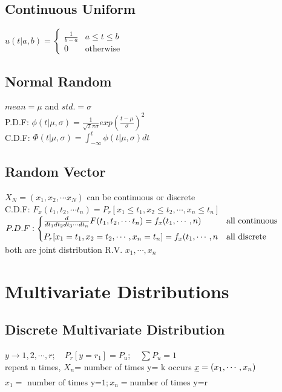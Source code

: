 \documentclass{article}
\begin{document}
\subsection{Continuous Uniform} 		
	$ u(t| a, b)= \begin{cases} \frac{1}{b-a}  & a \le t \le b \\ 
	0& \text{otherwise} \end{cases}$
	
            
\subsection{Normal Random}             
	$mean= \mu $ and $std.= \sigma $
	\\P.D.F: $\phi(t| \mu, \sigma)= \frac{1}{\sqrt{2} \pi \sigma }exp(\frac{t-\mu}{\sigma})^2$
	\\C.D.F: $\Phi(t| \mu, \sigma)=  \int_{-\infty}^{t} \phi(t| \mu, \sigma)dt$
        
\subsection{Random Vector}        
	$X_N=(x_1, x_2, \cdots x_N)$ can be continuous or discrete
	\\C.D.F: $F_x(t_1, t_2, \cdots t_n)= P_r[x_1\le t_1,x_2\le t_2, \cdots, x_n\le t_n]$
	\\$P.D.F: \begin{cases}
	\frac{d}{dt_1 dt_2 dt_3 \cdots dt_n} F(t_1, t_2, \cdots t_n)= f_{\uwave{x}}(t_1, \cdots, n) & \text{all continuous}\\
	P_r[x_1= t_1,x_2= t_2, \cdots, x_n=  t_n]=f_{x}(t_1, \cdots, n &\text{all discrete}  \end{cases}$
	\\both are joint distribution R.V. $x_1, \cdots, x_n$		


\section{Multivariate Distributions} 

\subsection{Discrete Multivariate Distribution}
$ y\rightarrow 1, 2, \cdots, r; \quad P_r[y=r_1]=P_u; \quad \sum P_u= 1$
\\repeat n times, $X_n$= number of times y= k occurs 
$\uwave{x}= (x_1, \cdots, x_n)$
$x_1= \text{ number of times y=1}; x_n= \text{number of times y=r}$
\end{document}
